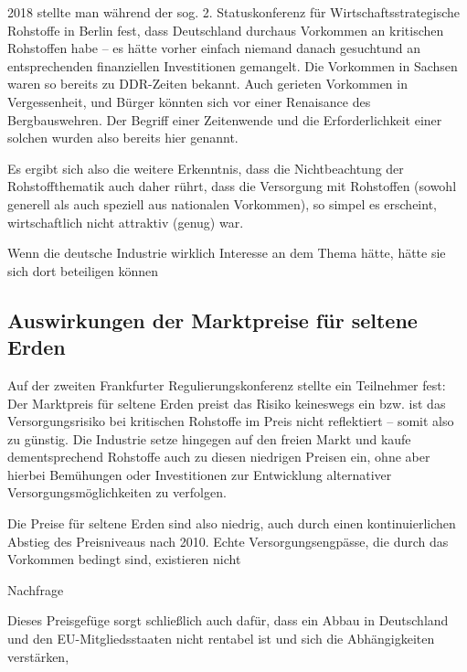 \documentclass[12pt,a4paper,oneside]{book} %
\begin{document}
2018 stellte man während der sog. 2. Statuskonferenz für Wirtschaftsstrategische Rohstoffe in Berlin fest, dass Deutschland durchaus Vorkommen an kritischen Rohstoffen habe -- es hätte vorher \glqq einfach niemand danach gesucht\grqq und an entsprechenden finanziellen Investitionen gemangelt.\autocite{VDINachrichten: Rohstoffe: Deutschland ist reich an seltenen Erden} Die Vorkommen in Sachsen waren so bereits zu DDR-Zeiten bekannt. Auch gerieten Vorkommen in Vergessenheit, und Bürger könnten sich vor einer \glqq Renaisance des Bergbaus\grqq wehren. Der Begriff einer Zeitenwende und die Erforderlichkeit einer solchen wurden also bereits hier genannt.





Es ergibt sich also die weitere Erkenntnis, dass die Nichtbeachtung der Rohstoffthematik auch daher rührt, dass die Versorgung mit Rohstoffen (sowohl generell als auch speziell aus nationalen Vorkommen), so simpel es erscheint, wirtschaftlich nicht attraktiv (genug) war.

\glqq Wenn die deutsche Industrie wirklich Interesse an dem Thema hätte, hätte sie sich dort beteiligen können\grqq \autocite{VDI Nachrichten Seltene Erden: Deutschland importiert lieber, als selbst zu fördern}


\subsection{Auswirkungen der Marktpreise für seltene Erden}

Auf der zweiten Frankfurter Regulierungskonferenz stellte ein Teilnehmer fest: Der Marktpreis für seltene Erden preist das Risiko keineswegs ein bzw. ist das Versorgungsrisiko bei kritischen Rohstoffe im Preis nicht reflektiert -- somit also \glqq zu günstig\grqq. Die Industrie setze hingegen auf den freien Markt und kaufe dementsprechend Rohstoffe auch zu diesen niedrigen Preisen ein, ohne aber hierbei Bemühungen oder Investitionen zur Entwicklung alternativer Versorgungsmöglichkeiten zu verfolgen.\autocite{VDI Nachrichten: Seltene Erden: Deutschland importiert lieber, als selbst zu fördern}

Die Preise für seltene Erden sind also niedrig, auch durch einen kontinuierlichen Abstieg des Preisniveaus nach 2010. Echte Versorgungsengpässe, die durch das Vorkommen bedingt sind, existieren nicht

Nachfrage

Dieses Preisgefüge sorgt schließlich auch dafür, dass ein Abbau in Deutschland und den EU-Mitgliedsstaaten nicht rentabel ist und sich die Abhängigkeiten verstärken,
\end{document}
